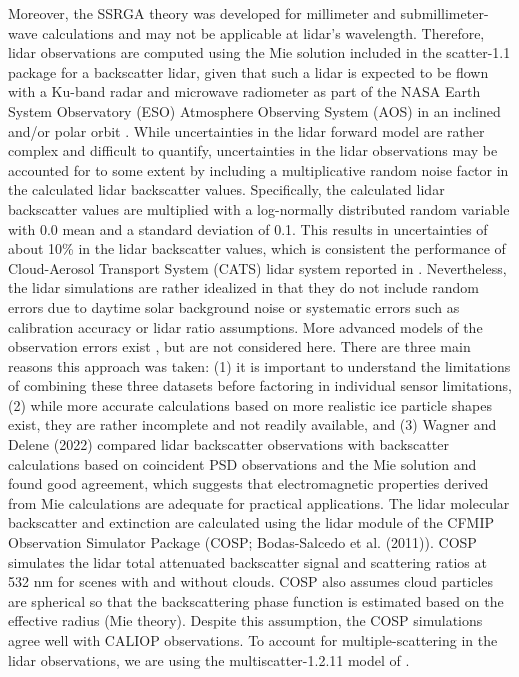 \documentclass{ametsocV6.1}
\begin{document}
Moreover, the SSRGA theory was developed for millimeter and 
submillimeter-wave calculations and may not be applicable at lidar's wavelength. 
Therefore, lidar observations are computed using the Mie solution included in the scatter-1.1 
package for a backscatter lidar, given that such a lidar is expected to be flown with a 
Ku-band radar and microwave radiometer as part of the NASA Earth System Observatory 
(ESO) Atmosphere Observing System (AOS) in an inclined and/or polar orbit \citep{yorks2022}.
While uncertainties in the lidar forward model are rather complex and difficult to quantify,
uncertainties in the lidar observations may be accounted for to some extent by including a
multiplicative random noise factor in the calculated lidar backscatter values.  Specifically, the calculated
lidar backscatter values are multiplied with a log-normally distributed random variable with 0.0 mean and a
standard deviation of 0.1.  This results in uncertainties of about 10\% in the lidar backscatter values, which is
consistent the performance of  Cloud-Aerosol Transport System (CATS) lidar system reported in \cite{pauly2019}.  
Nevertheless, the lidar simulations are rather idealized in that they do not include random errors due to daytime 
solar background noise or systematic errors such as calibration accuracy or lidar ratio
assumptions. More advanced models of the observation errors exist \citep{liu2006}, but are not 
considered here. There are three main reasons this approach was taken: (1) it is important to
understand the limitations of combining these three datasets before factoring in 
individual sensor limitations, (2) while more accurate calculations based on more 
realistic ice particle shapes exist, they are rather incomplete and not readily available,
and (3) Wagner and Delene (2022) compared lidar backscatter observations with backscatter 
calculations based on coincident PSD observations and the Mie solution and found good 
agreement, which suggests that electromagnetic properties derived from Mie calculations 
are adequate for practical applications. 
The lidar molecular backscatter and extinction
are calculated using the lidar module of the CFMIP Observation Simulator Package (COSP; 
Bodas-Salcedo et al. (2011)). COSP simulates the lidar total attenuated backscatter 
signal and scattering ratios at 532 nm for scenes with and without clouds. COSP also 
assumes cloud particles are spherical so that the backscattering phase function is 
estimated based on the effective radius (Mie theory). Despite this assumption, the 
COSP simulations agree well with CALIOP observations. To account for multiple-scattering 
in the lidar observations, we are using the multiscatter-1.2.11 model \citep{multiscatter-1.2.11} of 
\cite{hogan2008lidar_ms}. 
\end{document}
